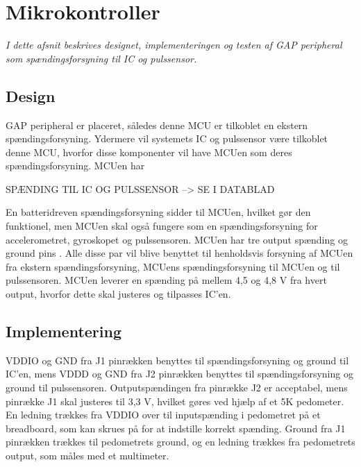 \section{Mikrokontroller}
\textit{I dette afsnit beskrives designet, implementeringen og testen af GAP peripheral som spændingsforsyning til IC og pulssensor.}

\subsection{Design}
GAP peripheral er placeret, således denne MCU er tilkoblet en ekstern spændingsforsyning. Ydermere vil systemets IC og pulssensor være tilkoblet denne MCU, hvorfor disse komponenter vil have MCUen som deres spændingsforsyning. \newline
MCUen har 

SPÆNDING TIL IC OG PULSSENSOR --> SE I DATABLAD

En batteridreven spændingsforsyning sidder til MCUen, hvilket gør den funktionel, men MCUen skal også fungere som en spændingsforsyning for accelerometret, gyroskopet og pulssensoren. MCUen har tre output spænding og ground pins \citep{Semiconductor2016}. Alle disse par vil blive benyttet til henholdsvis forsyning af MCUen fra ekstern spændingsforsyning, MCUens spændingsforsyning til MCUen og til pulssensoren. MCUen leverer en spænding på mellem 4,5 og 4,8 V fra hvert output, hvorfor dette skal justeres og tilpasses IC'en.

\subsection{Implementering}
VDDIO og GND fra J1 pinrækken benyttes til spændingsforsyning og ground til IC'en, mens VDDD og GND fra J2 pinrækken benyttes til spændingsforsyning og ground til pulssensoren. Outputspændingen fra pinrække J2 er acceptabel, mens pinrække J1 skal justeres til 3,3 V, hvilket gøres ved hjælp af et 5K pedometer. En ledning trækkes fra VDDIO over til inputspænding i pedometret på et breadboard, som kan skrues på for at indstille korrekt spænding. Ground fra J1 pinrækken trækkes til pedometrets ground, og en ledning trækkes fra pedometrets output, som måles med et multimeter.

